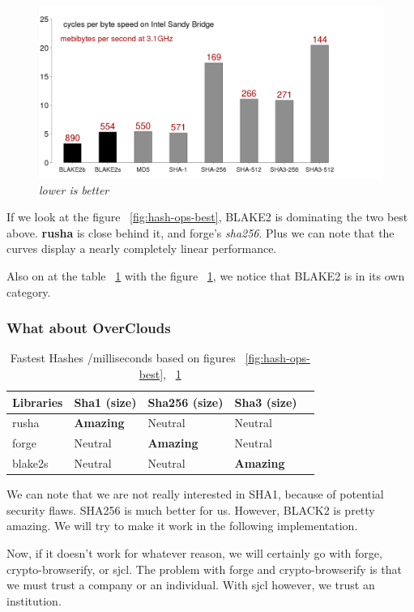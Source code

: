 \begin{figure}[htpb]
\centering
\caption{\small \sl lower is better
\label{fig:blake2-sandy}}
\includegraphics[scale=0.3]{annexes/graphs/blake2-sandy.png}
\end{figure}

If we look at the figure ~\ref{fig:hash-ops-best}, BLAKE2 is dominating the two best above. \textbf{rusha} is close behind it, and forge's \textit{sha256}. Plus we can note that the curves display a nearly completely linear performance.

Also on at the table ~\ref{tab:fastest-hashes} with the figure ~\ref{fig:blake2-sandy}, we notice that BLAKE2 is in its own category. 

\subsubsection{What about OverClouds}

\begin{table}[htpb]
\centering
\caption{Fastest Hashes /milliseconds based on figures ~\ref{fig:hash-ops-best}, ~\ref{fig:blake2-sandy}}
\label{tab:fastest-hashes}
\begin{adjustbox}{center, width=\columnwidth-20pt}
\begin{tabular}{|l|l|l|l|l|}
\hline
Libraries & Sha1 (size) & Sha256 (size) & Sha3 (size) \\ \hline
rusha    & \textbf{Amazing}    & Neutral    & Neutral        \\ \hline
forge    & Neutral    & \textbf{Amazing}    & Neutral        \\ \hline
blake2s    & Neutral    & Neutral    & \textbf{Amazing}    \\ \hline
\end{tabular}
\end{adjustbox}
\end{table}
We can note that we are not really interested in SHA1, because of potential security flaws. SHA256 is much better for us. However, BLACK2 is pretty amazing. We will try to make it work in the following implementation.

Now, if it doesn't work for whatever reason, we will certainly go with forge, crypto-browserify, or sjcl. The problem with forge and crypto-browserify is that we must trust a company or an individual. With sjcl however, we trust an institution.

